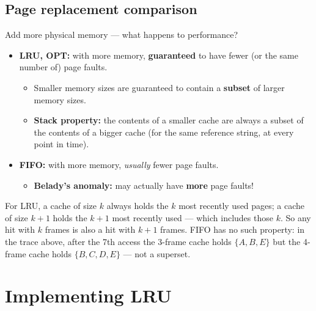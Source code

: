 \documentclass[11pt,a4paper]{article}
\begin{document}
\subsection{Page replacement comparison}

Add more physical memory --- what happens to performance?
\begin{itemize}
  \item \textbf{LRU, OPT:} with more memory, \textbf{guaranteed} to have
        fewer (or the same number of) page faults.
        \begin{itemize}
          \item Smaller memory sizes are guaranteed to contain a
                \textbf{subset} of larger memory sizes.
          \item \textbf{Stack property:} the contents of a smaller cache
                are always a subset of the contents of a bigger cache
                (for the same reference string, at every point in time).
        \end{itemize}
  \item \textbf{FIFO:} with more memory, \emph{usually} fewer page faults.
        \begin{itemize}
          \item \textbf{Belady's anomaly:} may actually have \textbf{more}
                page faults!
        \end{itemize}
\end{itemize}

\begin{keybox}
For LRU, a cache of size \(k\) always holds the \(k\) most recently used
pages; a cache of size \(k+1\) holds the \(k+1\) most recently used ---
which includes those \(k\). So any hit with \(k\) frames is also a hit with
\(k+1\) frames. FIFO has no such property: in the trace above, after the
7th access the 3-frame cache holds \(\{A,B,E\}\) but the 4-frame cache
holds \(\{B,C,D,E\}\) --- not a superset.
\end{keybox}

\section{Implementing LRU}
\end{document}
